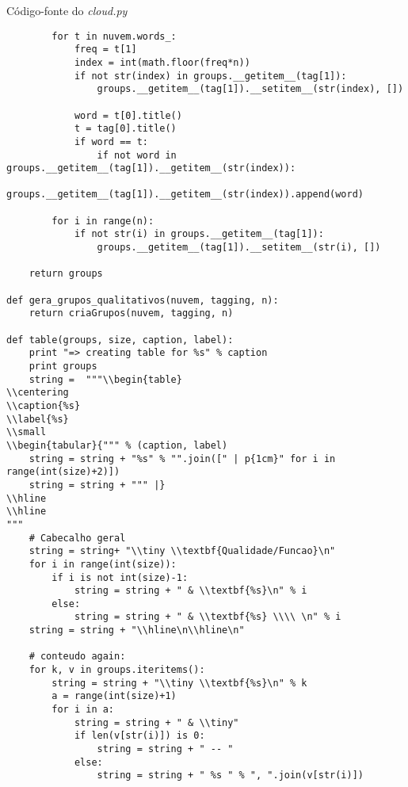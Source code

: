 \begin{example}{Código-fonte do \emph{cloud.py}}
\begin{verbatim}
        for t in nuvem.words_:
            freq = t[1]
            index = int(math.floor(freq*n))
            if not str(index) in groups.__getitem__(tag[1]):
                groups.__getitem__(tag[1]).__setitem__(str(index), [])

            word = t[0].title()
            t = tag[0].title()
            if word == t:
                if not word in groups.__getitem__(tag[1]).__getitem__(str(index)):
                    groups.__getitem__(tag[1]).__getitem__(str(index)).append(word)

        for i in range(n):
            if not str(i) in groups.__getitem__(tag[1]):
                groups.__getitem__(tag[1]).__setitem__(str(i), [])
                
    return groups

def gera_grupos_qualitativos(nuvem, tagging, n):
    return criaGrupos(nuvem, tagging, n)

def table(groups, size, caption, label):
    print "=> creating table for %s" % caption
    print groups
    string =  """\\begin{table}
\\centering
\\caption{%s}
\\label{%s}
\\small
\\begin{tabular}{""" % (caption, label)
    string = string + "%s" % "".join([" | p{1cm}" for i in range(int(size)+2)])
    string = string + """ |}
\\hline
\\hline
"""
    # Cabecalho geral
    string = string+ "\\tiny \\textbf{Qualidade/Funcao}\n"
    for i in range(int(size)):
        if i is not int(size)-1:
            string = string + " & \\textbf{%s}\n" % i
        else:
            string = string + " & \\textbf{%s} \\\\ \n" % i
    string = string + "\\hline\n\\hline\n"

    # conteudo again:
    for k, v in groups.iteritems():
        string = string + "\\tiny \\textbf{%s}\n" % k 
        a = range(int(size)+1)
        for i in a:
            string = string + " & \\tiny"
            if len(v[str(i)]) is 0:
                string = string + " -- "
            else:
                string = string + " %s " % ", ".join(v[str(i)])
    

\end{verbatim}
\end{example}
